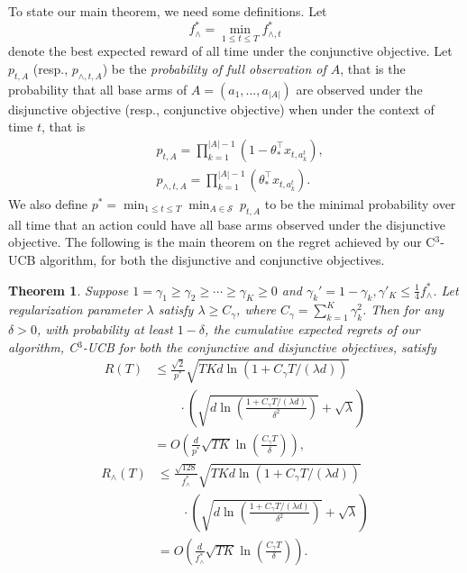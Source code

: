 \documentclass{article}
\newcommand{\cS}{\mathcal{S}}
\newcommand{\abs}[1]{\left| #1 \right|}
\newtheorem{theorem}{Theorem}[section]
\begin{document}
To state our main theorem, we need some definitions. Let
$$
f_{\wedge}^* = \min_{1 \leq t \leq T} f_{\wedge, t}^{\ast}
$$
denote the best expected reward of all time under the conjunctive objective.
Let $p_{t, A}$ (resp., $p_{\wedge, t, A}$) be the {\em probability of full
	observation of $A$}, that is the probability that all base arms of $A = (a_1, \ldots, a_{\abs{A}})$ are observed under the disjunctive objective (resp., conjunctive objective) when under the context of time $t$, that is 
\begin{align*}
&p_{t, A} = \prod_{k=1}^{\abs{A}-1} (1 - \theta_{\ast}^{\top} x_{t, a_k^t}),\\
&p_{\wedge, t, A} = \prod_{k=1}^{\abs{A}-1} (\theta_{\ast}^{\top} x_{t, a_k^t}).
\end{align*}
We also define $p^* = \min_{1 \leq t \leq T} \min_{A \in \cS} ~ p_{t, A}$ to be the minimal probability over all time that an action could have all base arms observed under the disjunctive objective. The following is the main theorem on the regret achieved by our C$^3$-UCB algorithm, for both the disjunctive and conjunctive objectives.
\begin{theorem}
\label{thm:main}
Suppose $1 = \gamma_1 \geq \gamma_2 \geq \cdots \geq \gamma_{K} \geq 0$ and 
$\gamma_k' = 1 - \gamma_k, \gamma'_K \leq \frac{1}{4}f_{\wedge}^{\ast}$.
Let regularization parameter $\lambda$ satisfy $\lambda \geq C_\gamma$, where $C_\gamma = \sum_{k=1}^{K} \gamma_k^2$. Then for any $\delta > 0$, with probability at least $1 - \delta$, the cumulative expected regrets of our algorithm, C$^3$-UCB for both the conjunctive and disjunctive objectives, satisfy
\begin{align}
R(T) &\le \frac{\sqrt{2}}{p^*} \sqrt{TKd\ln(1 + C_\gamma T/(\lambda d))}  \nonumber \\
&\qquad \cdot \left(\sqrt{d\ln \left( \frac{1 + C_\gamma T/(\lambda d)}{\delta^2}\right) } + \sqrt{\lambda}\right) \nonumber \\
&=O\left(\frac{d}{p^*} \sqrt{TK} \ln \left(\frac{C_\gamma T}{\delta}\right) \right),
\end{align}
\begin{align}
R_{\wedge}(T) &\le \frac{\sqrt{128}}{f_{\wedge}^{\ast}} \sqrt{TKd\ln(1 + C_\gamma T/(\lambda d))} \nonumber \\
&\qquad \cdot \left(\sqrt{d\ln \left( \frac{1 + C_\gamma T/(\lambda d)}{\delta^2}\right) } + \sqrt{\lambda}\right) \nonumber \\
&=O\left(\frac{d}{f_{\wedge}^{\ast}}\sqrt{TK} \ln \left(\frac{C_\gamma T}{\delta}\right) \right).
\end{align}
\end{theorem}
\end{document}
